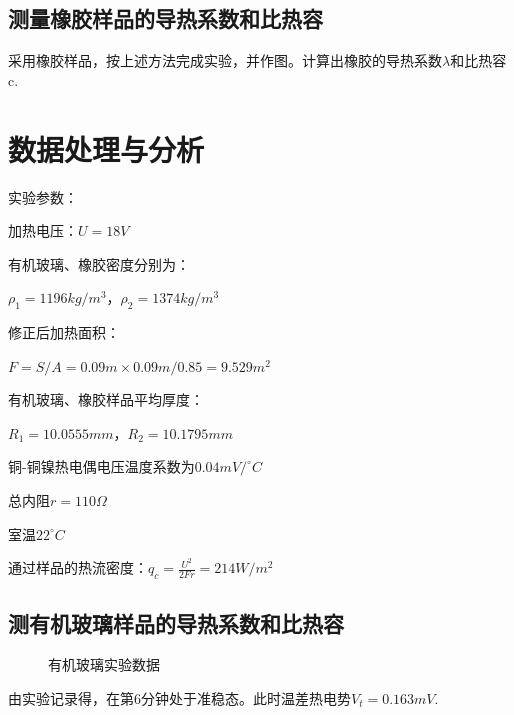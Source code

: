 \documentclass[10pt,a4paper,twocolumn,twoside,UTF8]{ctexart}
\begin{document}
	\subsection{测量橡胶样品的导热系数和比热容}
	采用橡胶样品，按上述方法完成实验，并作图。计算出橡胶的导热系数$\lambda$和比热容c.


\section{数据处理与分析}
实验参数：

加热电压：$U=18V$

有机玻璃、橡胶密度分别为：

$\rho_{1} = 1196 kg/m^3$，$\rho_{2} = 1374 kg/m^3$

修正后加热面积：

$F=S/A=0.09m\times0.09m/0.85=9.529m^2$

有机玻璃、橡胶样品平均厚度：

$R_1=10.0555mm$，$R_2=10.1795mm$

铜-铜镍热电偶电压温度系数为$0.04mV/^{\circ}C$

总内阻$r=110\varOmega$

室温$22^{\circ}C$

通过样品的热流密度：$q_c = \frac{U^2}{2Fr}=214W/m^2$

\subsection{测有机玻璃样品的导热系数和比热容}
\begin{figure}[!h]
	\centering
	\caption{有机玻璃实验数据}
\end{figure}

由实验记录得，在第6分钟处于准稳态。此时温差热电势$V_t=0.163mV$.
\end{document}
